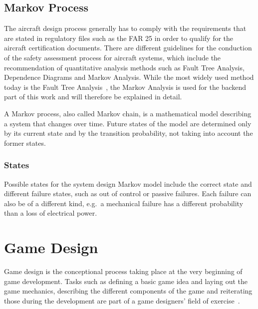 \subsection{Markov Process}\label{subsec:markov-process}
The aircraft design process generally has to comply with the requirements that are stated in regulatory files such as the FAR 25
in order to qualify for the aircraft certification documents.
There are different guidelines for the conduction of the safety assessment process for aircraft systems, which include the
recommendation of quantitative analysis methods such as Fault Tree Analysis, Dependence Diagrams and Markov Analysis.
While the most widely used method today is the Fault Tree Analysis~\cite{7447967}, the Markov Analysis is used for the backend
part of this work and will therefore be explained in detail.

A Markov process, also called Markov chain, is a mathematical model describing a system that changes over time.
Future states of the model are determined only by its current state and by the transition probability, not taking into account
the former states. 

\subsubsection{States}\label{subsubsec:states}
Possible states for the system design Markov model include the correct state and different failure states, such as out of control
or passive failures.
Each failure can also be of a different kind, e.g.\ a mechanical failure has a different probability than a loss of electrical power.

\section{Game Design}\label{sec:game-design}
Game design is the conceptional process taking place at the very beginning of game development.
Tasks such as defining a basic game idea and laying out the game mechanics, describing the different components of the game and
reiterating those during the development are part of a game designers' field of exercise~\cite{10.5555/2544002}.

